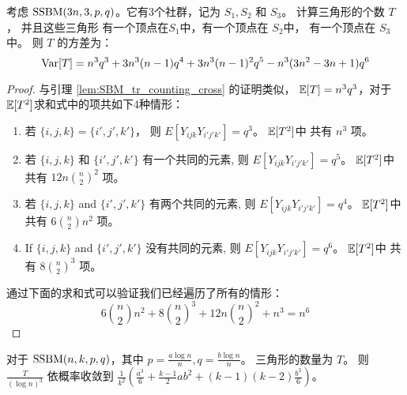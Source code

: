\begin{lemma}\label{lem:SBM_tr_counting_3}
	考虑 $\operatorname{SSBM}(3n, 3, p, q)$。它有3个社群，记为
  $S_1,S_2$ 和 $S_3$。
  计算三角形的个数 $T$，
  并且这些三角形 有一个顶点在$S_1$中，有一个顶点在 $S_2$中，
  有一个顶点在 $S_3$ 中。
	则 $T$ 的方差为：
	\begin{equation*}\label{eq:SBM_tr_counting_three}
	\operatorname{\mathrm{Var}}[T] = n^3 q^3  + 3n^3(n-1) q^4  + 3 n^3 (n-1)^2 q^5 - n^3(3n^2-3n+1)q^6
	\end{equation*}
\end{lemma}

\begin{proof}
	与引理 \ref{lem:SBM_tr_counting_cross} 的证明类似，
	$\operatorname{\mathbb{E}}[T] = n^3 q^3$，对于$\operatorname{\mathbb{E}}[T^2]$求和式中的项共如下4种情形：
	\begin{enumerate}
	\item 若 $\{i,j,k\} = \{i',j',k'\}$， 则 $E[Y_{ijk}Y_{i'j'k'}] = q^3$。
	$\operatorname{\mathbb{E}}[T^2]$中 共有 $n^3$ 项。
	\item 若 $\{i,j,k\}$ 和 $\{i',j',k'\}$ 有一个共同的元素, 则 $E[Y_{ijk}Y_{i'j'k'}] = q^5$。
	$\operatorname{\mathbb{E}}[T^2]$中 共有 $12n\binom{n}{2}^2$ 项。
	\item 若 $\{i,j,k\}$ and $\{i',j',k'\}$ 有两个共同的元素, 则 $E[Y_{ijk}Y_{i'j'k'}] = q^4$。
	$\operatorname{\mathbb{E}}[T^2]$中 共有 $6\binom{n}{2}n^2$ 项。
	\item If $\{i,j,k\}$ and $\{i',j',k'\}$ 没有共同的元素, 则  $E[Y_{ijk}Y_{i'j'k'}] = q^6$。
	$\operatorname{\mathbb{E}}[T^2]$中 共有 $8\binom{n}{2}^3$ 项。
\end{enumerate}	
通过下面的求和式可以验证我们已经遍历了所有的情形：
$$
6\binom{n}{2}n^2  + 8\binom{n}{2}^3 + 12n\binom{n}{2}^2 +  n^3 = n^6
$$
\end{proof}
\begin{lemma}\label{lem:sbmV}
 对于 $\operatorname{SSBM}(n, k, p, q)$，其中 $p=\frac{a\log n}{n}, q = \frac{b\log n}{n}$。
 三角形的数量为 $T$。
	则 $\frac{T}{(\log n)^3}$ 依概率收敛到 $\frac{1}{k^2}(\frac{a^3}{6} + \frac{k-1}{2}ab^2 + (k-1)(k-2)\frac{b^3}{6} )$。
\end{lemma}
